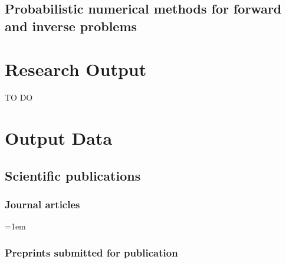 \documentclass[10pt]{article}
\begin{document}
\subsection{Probabilistic numerical methods for forward and inverse problems}\label{sec:Giacomo}


\section{Research Output}
{\color{red} TO DO}




\clearpage
\section{Output Data}

\subsection{Scientific publications}

\subsubsection*{Journal articles}

\sloppy
\emergencystretch=1em
\begin{enumerate}[label={[\arabic*]}]
	\item {}
	\item {}
	\item {}
	\item {}
	\item {}
	\item {}
	\item {}
	\item {}
	\item {}
	\item {}
	\item {}
	\item {}
\end{enumerate}

\subsubsection*{Preprints submitted for publication}
\end{document}
